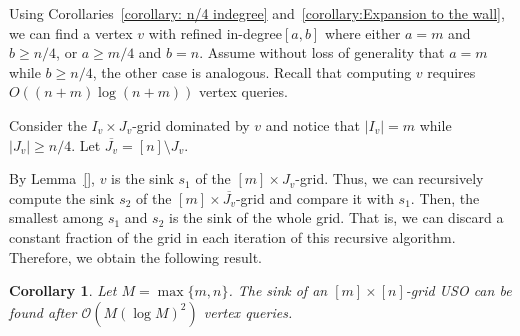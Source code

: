 \documentclass[a4paper,10pt]{article}
\newtheorem{corollary}{Corollary}
\newcommand{\indegree}{refined in-degree\xspace}
\begin{document}
Using  Corollaries~\ref{corollary: n/4 indegree} and~\ref{corollary:Expansion to the wall}, we can find a vertex $v$ with \indegree $[a,b]$ where either $a = m$ and $b \geq  n/4$, or $a \geq  m/4$ and $b  = n$. Assume without loss of generality that $a = m$ while $b\geq  n/4$, the other case is analogous. Recall that computing $v$ requires $O((n + m) \log (n+m))$ vertex queries.

Consider the $I_v\times J_v$-grid dominated by $v$ and 
notice that $|I_v| = m$ while $|J_v| \geq n/4$. Let $\overline{J_v} = [n]\setminus J_v$.

By Lemma~\ref{}, $v$ is the sink $s_1$ of the $[m] \times J_v$-grid. Thus, we can recursively compute the sink $s_2$ of the $[m]\times \overline{J_v}$-grid and compare it with $s_1$. Then, the smallest among $s_1$ and $s_2$ is the sink of the whole grid.
That is, we can discard a constant fraction of the grid in each iteration of this recursive algorithm. Therefore, we obtain the following result.

\begin{corollary}
 Let $M = \max\{m,n\}$. The sink of an $[m]\times[n]$-grid USO can be found after $\mathcal{O}(M(\log M)^2)$ vertex queries.
\end{corollary}
 





\end{document}

